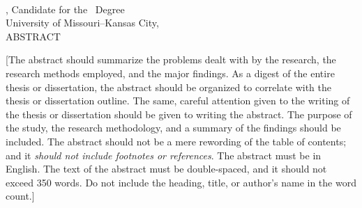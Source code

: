 \begin{center}
\vspace*{0.01in}
\normalsize{\MakeUppercase{\MyThesisTitle}}\\
\vspace{24pt}
\normalsize{
  \MyName, Candidate for the \MyDegree\ Degree\\
  University of Missouri--Kansas City, \MyDegreeAwardYear\\
  \vspace{24pt}
  \MakeUppercase{Abstract}
  \vspace{12pt}
}
\end{center}

\doublespacing



[The abstract should summarize the problems dealt with by the research, the research methods employed, and the major findings. As a digest of the entire thesis or dissertation, the abstract should be organized to correlate with the thesis or dissertation outline. The same, careful attention given to the writing of the thesis or dissertation should be given to writing the abstract. The purpose of the study, the research methodology, and a summary of the findings should be included. The abstract should not be a mere rewording of the table of contents; and it \textit{should not include footnotes or references}. The abstract must be in English. The text of the abstract must be double-spaced, and it should not exceed 350 words. Do not include the heading, title, or author's name in the word count.]
